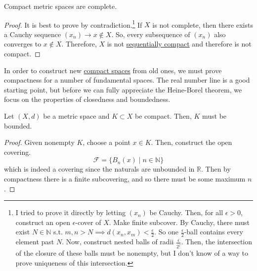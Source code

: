 	\begin{theorem}
		\label{thm:compact_complete}
    Compact metric spaces are complete. 
  \end{theorem} 
	\begin{proof}
		It is best to prove by contradiction.\footnote{I tried to prove it directly by letting $(x_n)$ be Cauchy. Then, for all $\epsilon > 0$, construct an open $\epsilon$-cover of $X$. Make finite subcover. By Cauchy, there must exist $N \in \mathbb{N}$ s.t. $m, n > N \implies d(x_n, x_m) < \frac{\epsilon}{2}$. So one $\frac{\epsilon}{2}$-ball contains every element past $N$. Now, construct nested balls of radii $\frac{\epsilon}{2^j}$. Then, the intersection of the closure of these balls must be nonempty, but I don't know of a way to prove uniqueness of this intersection.} If $X$ is not complete, then there exists a Cauchy sequence $(x_n) \to x \not\in X$. So, every subsequence of $(x_n)$ also converges to $x \not\in X$. Therefore, $X$ is not \hyperref[def:sequentially-compact]{sequentially compact} and therefore is not compact. 
	\end{proof}

  In order to construct new \hyperref[def:compact-space]{compact spaces} from old ones, we must prove compactness for a number of fundamental spaces. The real number line is a good starting point, but before we can fully appreciate the Heine-Borel theorem, we focus on the properties of closedness and boundedness. 

  \begin{theorem}
    \label{thm:compact-subsets-of-metric-spaces-are-bounded}
    Let $(X, d)$ be a metric space and $K \subset X$ be compact. Then, $K$ must be bounded. 
  \end{theorem} 
  \begin{proof}
    Given nonempty $K$, choose a point $x \in K$. Then, construct the open covering. 
    \begin{equation}
      \mathcal{F} = \{ B_n (x) \mid n \in \mathbb{N} \}
    \end{equation}
    which is indeed a covering since the naturals are unbounded in $\mathbb{R}$. Then by compactness there is a finite subcovering, and so there must be some maximum $n$. 
  \end{proof}

